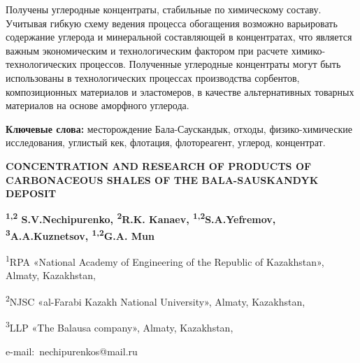 Получены углеродные концентраты, стабильные по химическому составу.
Учитывая гибкую схему ведения процесса обогащения возможно варьировать
содержание углерода и минеральной составляющей в концентратах, что
является важным экономическим и технологическим фактором при расчете
химико-технологических процессов. Полученные углеродные концентраты
могут быть использованы в технологических процессах производства
сорбентов, композиционных материалов и эластомеров, в качестве
альтернативных товарных материалов на основе аморфного углерода.

{\bfseries Ключевые слова:} месторождение Бала-Саускандык, отходы,
физико-химические исследования, углистый кек, флотация, флотореагент,
углерод, концентрат.

\begin{center}
{\large\bfseries CONCENTRATION AND RESEARCH OF PRODUCTS OF CARBONACEOUS SHALES OF
THE BALA-SAUSKANDYK DEPOSIT}

{\bfseries \textsuperscript{1,2} S.V.Nechipurenko, \textsuperscript{2}R.K.
Kanaev, \textsuperscript{1,2}S.A.Yefremov,
\textsuperscript{3}A.A.Kuznetsov, \textsuperscript{1,2}G.A. Mun}

\textsuperscript{1}RPA «National Academy of Engineering of the Republic
of Kazakhstan», Almaty, Kazakhstan,

\textsuperscript{2}NJSC «al-Farabi Kazakh National University», Almaty,
Kazakhstan,

\textsuperscript{3}LLP «The Balausa company», Almaty, Kazakhstan,

e-mail:~nechipurenkos@mail.ru
\end{center}

